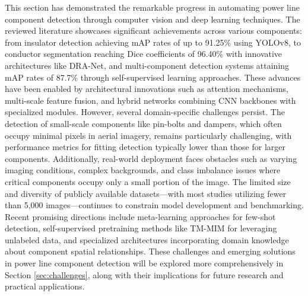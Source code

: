 This section has demonstrated the remarkable progress in automating power line component detection through computer vision and deep learning techniques. The reviewed literature showcases significant achievements across various components: from insulator detection achieving mAP rates of up to 91.25\% using YOLOv8, to conductor segmentation reaching Dice coefficients of 96.40\% with innovative architectures like DRA-Net, and multi-component detection systems attaining mAP rates of 87.7\% through self-supervised learning approaches. These advances have been enabled by architectural innovations such as attention mechanisms, multi-scale feature fusion, and hybrid networks combining CNN backbones with specialized modules. However, several domain-specific challenges persist. The detection of small-scale components like pin-bolts and dampers, which often occupy minimal pixels in aerial imagery, remains particularly challenging, with performance metrics for fitting detection typically lower than those for larger components. Additionally, real-world deployment faces obstacles such as varying imaging conditions, complex backgrounds, and class imbalance issues where critical components occupy only a small portion of the image. The limited size and diversity of publicly available datasets—with most studies utilizing fewer than 5,000 images—continues to constrain model development and benchmarking. Recent promising directions include meta-learning approaches for few-shot detection, self-supervised pretraining methods like TM-MIM for leveraging unlabeled data, and specialized architectures incorporating domain knowledge about component spatial relationships. These challenges and emerging solutions in power line component detection will be explored more comprehensively in Section \ref{sec:challenges}, along with their implications for future research and practical applications.

